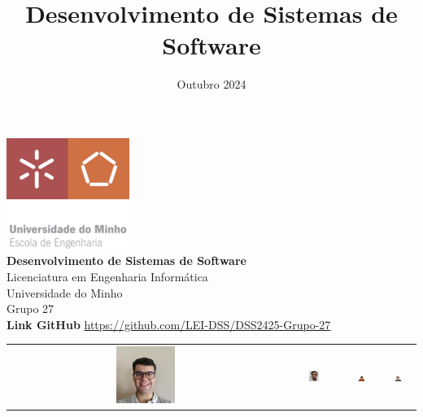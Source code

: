 \documentclass[a4paper,12pt]{article}
\title{\textbf{Desenvolvimento de Sistemas de Software}}
\date{Outubro 2024}
\begin{document}
    \begin{titlepage}
        \centering
        \vfill
        \includegraphics[width=4cm]{512px-EEUMLOGO.png}\\
        \vspace{1.1in}
        \Large\textbf{Desenvolvimento de Sistemas de Software}\\
        Licenciatura em Engenharia Informática\\
        Universidade do Minho\\
        Grupo 27\\
        
        \textbf{Link GitHub} \href{https://github.com/LEI-DSS/DSS2425-Grupo-27}{https://github.com/LEI-DSS/DSS2425-Grupo-27}
        
      \vspace{3cm}

      
        \begin{center}
            \begin{tabular}{c c c c}
                \includegraphics[width=0.22\textwidth]{dev1.png} & 
                \includegraphics[width=0.22\textwidth]{dev2.png} & 
                \includegraphics[width=0.22\textwidth]{dev3.png} & 
                \includegraphics[width=0.22\textwidth]{dev4.png}\\
    

\end{tabular}
\end{center}
\end{titlepage}
\end{document}
